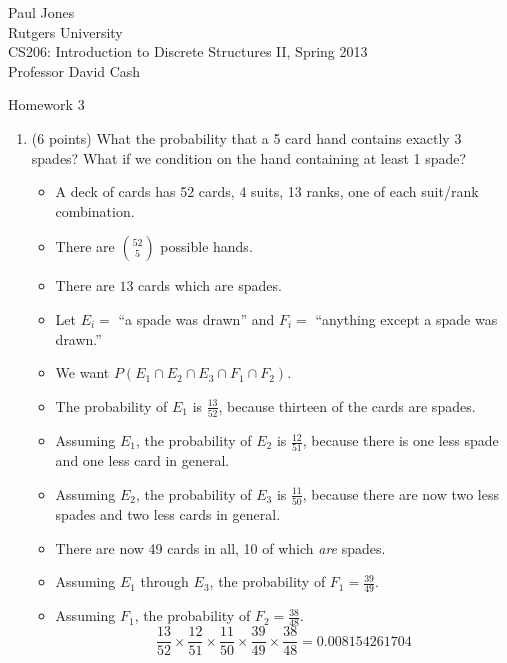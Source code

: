 \documentclass[11pt]{article}
\begin{document}
\sloppy

\noindent Paul Jones \\
Rutgers University\\
CS206: Introduction to Discrete Structures II, Spring 2013\\
Professor David Cash\\

\begin{center}
Homework 3 
\end{center}

\vspace{.1in}

\begin{enumerate}

\item (6 points) What the probability that a 5 card hand contains exactly 3
spades?  What if we condition on the hand containing at least 1 spade?

\begin{itemize}

\item A deck of cards has 52 cards, 4 suits, 13 ranks, one of each suit/rank combination.
\item There are $52 \choose 5$ possible hands.
\item There are $13$ cards which are spades.
\item Let $E_i = $ ``a spade was drawn'' and $F_i = $ ``anything except a spade was drawn.''
\item We want $P(E_1 \cap E_2 \cap E_3 \cap F_1 \cap F_2)$.
\item The probability of $E_1$ is $\frac{13}{52}$, because thirteen of the cards are spades.
\item Assuming $E_1$, the probability of $E_2$ is $\frac{12}{51}$, because there is one less spade and one less card in general.
\item Assuming $E_2$, the probability of $E_3$ is $\frac{11}{50}$, because there are now two less spades and two less cards in general.
\item There are now 49 cards in all, 10 of which \emph{are} spades. 
\item Assuming $E_1$ through $E_3$, the probability of $F_1 = \frac{39}{49}$.
\item Assuming $F_1$, the probability of $F_2 = \frac{38}{48}$.
\begin{equation*}
\frac{13}{52}\times\frac{12}{51}\times\frac{11}{50}\times\frac{39}{49}\times\frac{38}{48} = 0.008154261704
\end{equation*}


\end{itemize}
\end{enumerate}
\end{document}
